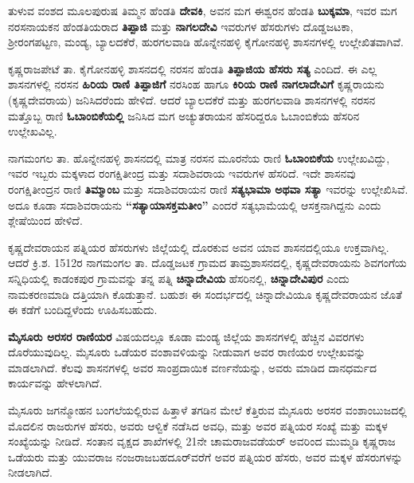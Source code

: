 ತುಳುವ ವಂಶದ ಮೂಲಪುರುಷ ತಿಮ್ಮನ ಹೆಂಡತಿ \textbf{ದೇವಕಿ}, ಅವನ ಮಗ ಈಶ್ವರನ ಹೆಂಡತಿ \textbf{ಬುಕ್ಕಮಾ}, ಇವರ ಮಗ ನರಸನಾಯಕನ ಹೆಂಡತಿಯರಾದ \textbf{ತಿಪ್ಪಾಜಿ} ಮತ್ತು \textbf{ನಾಗಲದೇವಿ} ಇವರುಗಳ ಹೆಸರುಗಳು ದೊಡ್ಡಜಟಕಾ, ಶ‍್ರೀರಂಗಪಟ್ಟಣ, ಮಂಡ್ಯ, ಬ್ಯಾಲದಕೆರೆ, ಹುರಗಲವಾಡಿ ಹೊನ್ನೇನಹಳ್ಳಿ ಕೈಗೋನಹಳ್ಳಿ ಶಾಸನಗಳಲ್ಲಿ ಉಲ್ಲೇಖಿತವಾಗಿವೆ.

ಕೃಷ್ಣರಾಜಪೇಟೆ ತಾ. ಕೈಗೋನಹಳ್ಳಿ ಶಾಸನದಲ್ಲಿ ನರಸನ ಹೆಂಡತಿ \textbf{ತಿಪ್ಪಾಜಿಯ ಹೆಸರು ಸತ್ಯ} ಎಂದಿದೆ. ಈ ಎಲ್ಲ ಶಾಸನಗಳಲ್ಲಿ ನರಸನ \textbf{ಹಿರಿಯ ರಾಣಿ ತಿಪ್ಪಾಜಿಗೆ} ನರಸಿಂಹ ಹಾಗೂ \textbf{ಕಿರಿಯ ರಾಣಿ ನಾಗಲಾದೇವಿಗೆ} ಕೃಷ್ಣರಾಯನು (ಕೃಷ್ಣದೇವರಾಯ) ಜನಿಸಿದರೆಂದು ಹೇಳಿದೆ. ಆದರೆ ಬ್ಯಾಲದಕೆರೆ ಮತ್ತು ಹುರಗಲವಾಡಿ ಶಾಸನಗಳಲ್ಲಿ ನರಸನ ಮತ್ತೊಬ್ಬ ರಾಣಿ \textbf{ಓಬಾಂಬಿಕೆಯಲ್ಲಿ} ಜನಿಸಿದ ಮಗ ಅಚ್ಯುತರಾಯನ ಹೆಸರಿದ್ದರೂ ಓಬಾಂಬಿಕೆಯ ಹೆಸರಿನ ಉಲ್ಲೇಖವಿಲ್ಲ.

ನಾಗಮಂಗಲ ತಾ. ಹೊನ್ನೇನಹಳ್ಳಿ ಶಾಸನದಲ್ಲಿ ಮಾತ್ರ ನರಸನ ಮೂರನೆಯ ರಾಣಿ \textbf{ಓಬಾಂಬಿಕೆಯ} ಉಲ್ಲೇಖವಿದ್ದು, ಇವರ ಇಬ್ಬರು ಮಕ್ಕಳಾದ ರಂಗಕ್ಷಿತೀಂದ್ರ ಮತ್ತು ಸದಾಶಿವರಾಯ ಇವರುಗಳ ಹೆಸರಿದೆ. ಇದೇ ಶಾಸನವು ರಂಗಕ್ಷಿತೀಂದ್ರನ ರಾಣಿ \textbf{ತಿಮ್ಮಾಂಬ} ಮತ್ತು ಸದಾಶಿವರಾಯನ ರಾಣಿ \textbf{ಸತ್ಯಭಾಮಾ ಅಥವಾ ಸತ್ಯಾ} ಇವರನ್ನು ಉಲ್ಲೇಖಿಸಿವೆ. ಅದೂ ಕೂಡಾ ಸದಾಶಿವರಾಯನು \textbf{“ಸತ್ಯಾಯಾಸಕ್ತಮತೀಂ”} ಎಂದರೆ ಸತ್ಯಭಾಮೆಯಲ್ಲಿ ಆಸಕ್ತನಾಗಿದ್ದನು ಎಂದು ಶ್ಲೇಷೆಯಿಂದ ಹೇಳಿದೆ.

ಕೃಷ್ಣದೇವರಾಯನ ಪತ್ನಿಯರ ಹೆಸರುಗಳು ಜಿಲ್ಲೆಯಲ್ಲಿ ದೊರಕುವ ಅವನ ಯಾವ ಶಾಸನದಲ್ಲಿಯೂ ಉಕ್ತವಾಗಿಲ್ಲ. ಆದರೆ ಕ್ರಿ.ಶ. 1512ರ ನಾಗಮಂಗಲ ತಾ. ದೊಡ್ಡಜಟಕ ಗ್ರಾಮದ ತಾಮ್ರಶಾಸನದಲ್ಲಿ, ಕೃಷ್ಣದೇವರಾಯನು ಶಿವಗಂಗೆಯ ಸನ್ನಿಧಿಯಲ್ಲಿ ಕಾಡಂಕಪುರ ಗ್ರಾಮವನ್ನು ತನ್ನ ಪತ್ನಿ \textbf{ಚಿನ್ನಾದೇವಿಯ} ಹೆಸರಿನಲ್ಲಿ, \textbf{ಚಿನ್ನಾದೇವಿಪುರ} ಎಂದು ನಾಮಕರಣಮಾಡಿ ದತ್ತಿಯಾಗಿ ಕೊಡುತ್ತಾನೆ. ಬಹುಶಃ ಈ ಸಂದರ್ಭದಲ್ಲಿ ಚಿನ್ನಾದೇವಿಯೂ ಕೃಷ್ಣದೇವರಾಯನ ಜೊತೆ ಈ ಕಡೆಗೆ ಬಂದಿದ್ದಳೆಂದು ಊಹಿಸಬಹುದು.

\textbf{ಮೈಸೂರು ಅರಸರ ರಾಣಿಯರ} ವಿಷಯದಲ್ಲೂ ಕೂಡಾ ಮಂಡ್ಯ ಜಿಲ್ಲೆಯ ಶಾಸನಗಳಲ್ಲಿ ಹೆಚ್ಚಿನ ವಿವರಗಳು ದೊರೆಯುವುದಿಲ್ಲ. ಮೈಸೂರು ಒಡೆಯರ ವಂಶಾವಳಿಯನ್ನು ನೀಡುವಾಗ ಅವರ ರಾಣಿಯರ ಉಲ್ಲೇಖವನ್ನು ಮಾಡಲಾಗಿದೆ. ಕೆಲವು ಶಾಸನಗಳಲ್ಲಿ ಅವರ ಸಾಂಪ್ರದಾಯಿಕ ವರ್ಣನೆಯನ್ನು, ಅವರು ಮಾಡಿದ ದಾನಧರ್ಮದ ಕಾರ್ಯವನ್ನು ಹೇಳಲಾಗಿದೆ.

ಮೈಸೂರು ಜಗನ್ಮೋಹನ ಬಂಗಲೆಯಲ್ಲಿರುವ ಹಿತ್ತಾಳೆ ತಗಡಿನ ಮೇಲೆ ಕೆತ್ತಿರುವ ಮೈಸೂರು ಅರಸರ ವಂಶಾಂಬುಜ\-ದಲ್ಲಿ ಮೊದಲಿನ ರಾಜರುಗಳ ಹೆಸರು, ಅವರು ಆಳ್ವಿಕೆ ನಡೆಸಿದ ಅವಧಿ, ಮತ್ತು ಅವರ ಪತ್ನಿಯರ ಸಂಖ್ಯೆ ಮತ್ತು ಮಕ್ಕಳ ಸಂಖ್ಯೆಯನ್ನು ನೀಡಿದೆ. ಸಂತಾನ ವೃಕ್ಷದ ಶಾಖೆಗಳಲ್ಲಿ 21ನೇ ಚಾಮರಾಜವಡೆಯರ್​ ಅವರಿಂದ ಮುಮ್ಮಡಿ ಕೃಷ್ಣರಾಜ ಒಡೆಯರು ಮತ್ತು ಯುವರಾಜ ನಂಜರಾಜಬಹದೂರ್​ವರೆಗೆ ಅವರ ಪತ್ನಿಯರ ಹೆಸರು, ಅವರ ಮಕ್ಕಳ ಹೆಸರುಗಳನ್ನು ನೀಡಲಾಗಿದೆ.

